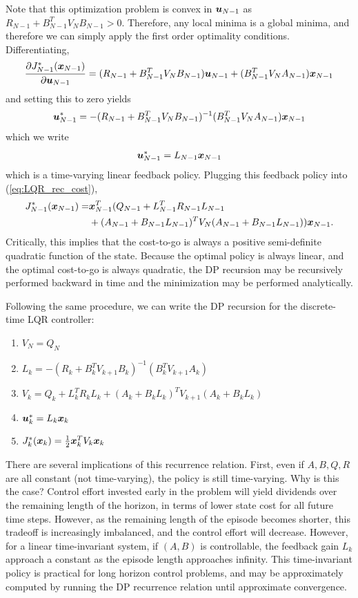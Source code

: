 Note that this optimization problem is convex in $\bm{u}_{N-1}$ as $R_{N-1} + B_{N-1}^T V_N B_{N-1} > 0$. Therefore, any local minima is a global minima, and therefore we can simply apply the first order optimality conditions. Differentiating,
\begin{equation}
    \frac{\partial J_{N-1}^*(\bm{x}_{N-1})}{\partial \bm{u}_{N-1}} = (R_{N-1} + B_{N-1}^T V_N B_{N-1}) \bm{u}_{N-1} + (B_{N-1}^T V_N A_{N-1}) \bm{x}_{N-1}
\end{equation}
and setting this to zero yields
\begin{equation}
    \bm{u}^*_{N-1} = - (R_{N-1} + B_{N-1}^T V_N B_{N-1})^{-1} (B_{N-1}^T V_N A_{N-1}) \bm{x}_{N-1}
\end{equation}
which we write
\begin{equation}
    \bm{u}^*_{N-1} = L_{N-1} \bm{x}_{N-1}
\end{equation}
which is a time-varying linear feedback policy. Plugging this feedback policy into (\ref{eq:LQR_rec_cost}),
\begin{align}
    J_{N-1}^*(\bm{x}_{N-1}) =& \bm{x}_{N-1}^T (Q_{N-1}  + L_{N-1}^T R_{N-1} L_{N-1} \\
    & + (A_{N-1} + B_{N-1} L_{N-1})^T V_N   (A_{N-1} + B_{N-1} L_{N-1})) \bm{x}_{N-1}. \nonumber
\end{align}
Critically, this implies that the cost-to-go is always a positive semi-definite quadratic function of the state. Because the optimal policy is always linear, and the optimal cost-to-go is always quadratic, the DP recursion may be recursively performed backward in time and the minimization may be performed analytically. 

Following the same procedure, we can write the DP recursion for the discrete-time LQR controller:
\begin{enumerate}
    \item $V_N= Q_N$
    \item $L_k = - (R_{k} + B_{k}^T V_{k+1} B_{k})^{-1} (B_{k}^T V_{k+1} A_{k})$
    \item $V_{k} = Q_{k}  + L_{k}^T R_{k} L_{k} + (A_{k} + B_{k} L_{k})^T V_{k+1}   (A_{k} + B_{k} L_{k})$
    \item $\bm{u}^*_k = L_k \bm{x}_k$
    \item $J^*_k(\bm{x}_k) = \frac{1}{2} \bm{x}_k^T V_k \bm{x}_k$
\end{enumerate}
There are several implications of this recurrence relation. First, even if $A,B,Q,R$ are all constant (not time-varying), the policy is still time-varying. Why is this the case? Control effort invested early in the problem will yield dividends over the remaining length of the horizon, in terms of lower state cost for all future time steps. However, as the remaining length of the episode becomes shorter, this tradeoff is increasingly imbalanced, and the control effort will decrease. 
However, for a linear time-invariant system, if $(A,B)$ is controllable, the feedback gain $L_k$ approach a constant as the episode length approaches infinity. This time-invariant policy is practical for long horizon control problems, and may be approximately computed by running the DP recurrence relation until approximate convergence. 


